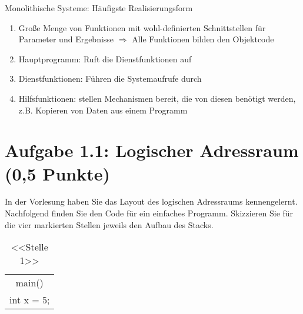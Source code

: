 \documentclass[a4paper,12pt]{article}
\begin{document}
 \vspace{\baselineskip}
 \large Monolithische Systeme: Häufigste Realisierungsform
 \normalsize
 \begin{enumerate}
 	\item Große Menge von Funktionen mit wohl-definierten Schnittstellen für Parameter und Ergebnisse $\Rightarrow$ Alle Funktionen bilden den Objektcode
 	\item Hauptprogramm: Ruft die Dienstfunktionen auf
 	\item Dienstfunktionen: Führen die Systemaufrufe durch
 	\item Hilfsfunktionen: stellen Mechanismen bereit, die von diesen benötigt werden, z.B. Kopieren von Daten aus einem Programm
 \end{enumerate}


\section*{Aufgabe 1.1: Logischer Adressraum (0,5 Punkte)}

	In der Vorlesung haben Sie das Layout des logischen Adressraums kennengelernt. Nachfolgend finden Sie
den Code für ein einfaches Programm. Skizzieren Sie für die vier markierten Stellen jeweils den Aufbau
des Stacks.
\begin{table}
	\begin{center}
		\begin{tabular}{|c|}
	\\ 
	\hline main() \\ int x = 5;
	\\ 
	\hline 
		\end{tabular}
	\end{center}
 \caption*{<<Stelle 1>>}
\end{table}
\vspace{\baselineskip}
\vspace{\baselineskip}
\end{document}
